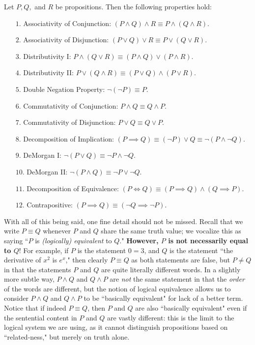 \documentclass{article}
\begin{document}
\begin{theorem}
Let $P, Q,$ and $R$ be propositions. Then the following properties hold:
\begin{enumerate}
    \item[$1.$] Associativity of Conjunction: $(P\land Q)\land R \equiv P \land (Q\land R)$.
    \item[$2.$] Associativity of Disjunction: $(P\lor Q)\lor R\equiv P\lor (Q\lor R)$.
    \item[$3.$] Distributivity I: $P \land (Q\lor R) \equiv (P\land Q) \lor (P \land R)$.
    \item[$4.$] Distributivity II: $P\lor (Q\land R) \equiv (P\lor Q) \land (P\lor R)$.
    \item[$5.$] Double Negation Property: $\lnot(\lnot P) \equiv P$.
    \item[$6.$] Commutativity of Conjunction: $P\land Q \equiv Q\land P$.
    \item[$7.$] Commutativity of Disjunction: $P\lor Q \equiv Q\lor P$.
    \item[$8.$] Decomposition of Implication: $(P \implies Q) \equiv (\lnot P) \lor Q \equiv \lnot (P \land \lnot Q)$.
    \item[$9.$] DeMorgan I: $\lnot (P\lor Q) \equiv \lnot P \land \lnot Q$.
    \item[$10.$] DeMorgan II: $\lnot (P\land Q) \equiv \lnot P\lor \lnot Q$.
    \item[$11.$] Decomposition of Equivalence: $(P\iff Q) \equiv (P\implies Q)\land (Q\implies P)$.
    \item[$12.$] Contrapositive: $(P\implies Q) \equiv (\lnot Q\implies \lnot P)$.
\end{enumerate}
\end{theorem}
With all of this being said, one fine detail should not be missed. Recall that we write $P\equiv Q$ whenever $P$ and $Q$ share the same truth value; we vocalize this as saying ``$P$ is \textit{(logically) equivalent} to $Q$." \textbf{However, $P$ is not necessarily equal to $Q$}! For example, if $P$ is the statement $0=3$, and $Q$ is the statement ``the derivative of $x^2$ is $e^x$," then clearly $P\equiv Q$ as both statements are false, but $P\neq Q$ in that the statements $P$ and $Q$ are quite literally different words. In a slightly more subtle way, $P\land Q$ and $Q\land P$ are \textit{not} the same statement in that the \textit{order} of the words are different, but the notion of logical equivalence allows us to consider $P\land Q$ and $Q\land P$ to be ``basically equivalent" for lack of a better term. Notice that if indeed $P\equiv Q$, then $P$ and $Q$ are also ``basically equivalent" even if the sentential content in $P$ and $Q$ are vastly different: this is the limit to the logical system we are using, as it cannot distinguish propositions based on ``related-ness," but merely on truth alone.
\end{document}
